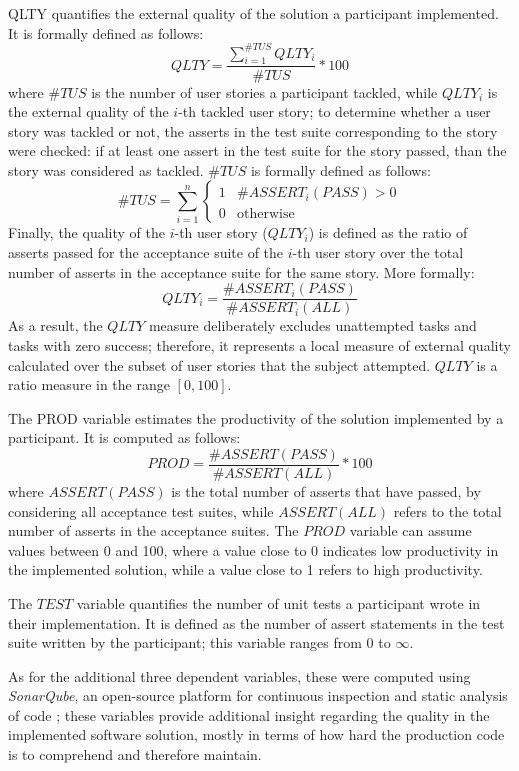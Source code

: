 QLTY quantifies the external quality of the solution a participant implemented. It is formally defined as follows: 
\[
    QLTY = \frac{\sum_{i=1}^{\#TUS} QLTY_i}{\#TUS} * 100 
\]
where $\#TUS$ is the number of user stories a participant tackled, while $QLTY_i$ is the external quality of the $i$-th tackled user story; to determine whether a user story was tackled or not, the asserts in the test suite corresponding to the story were checked: if at least one assert in the test suite for the story passed, than the story was considered as tackled. $\#TUS$ is formally defined as follows:
\[
    \#TUS = \sum_{i=1}^{n} 
        \begin{cases}
            1 & \text{$\#ASSERT_i(PASS) > 0$}\\
                0 & \text{otherwise}
        \end{cases}
\]
Finally, the quality of the $i$-th user story (\ie $QLTY_i$) is defined as the ratio of asserts passed for the acceptance suite of the $i$-th user story over the total number of asserts in the acceptance suite for the same story. More formally:
\[
    QLTY_i = \frac{\#ASSERT_i(PASS)}{\#ASSERT_i(ALL)}
\]
As a result, the $QLTY$ measure deliberately excludes unattempted tasks and tasks with zero success; therefore, it represents a local measure of external quality calculated over the subset of user stories that the subject attempted. $QLTY$ is a ratio measure in the range $[0, 100]$.

The PROD variable estimates the productivity of the solution implemented by a participant. It is computed as follows:
\[
    PROD = \frac{\#ASSERT(PASS)}{\#ASSERT(ALL)} * 100
\]
where $ASSERT(PASS)$ is the total number of asserts that have passed, by considering all acceptance test suites, while $ASSERT(ALL)$ refers to the total number of asserts in the acceptance suites. The $PROD$ variable can assume values between 0 and 100, where a value close to 0 indicates low productivity in the implemented solution, while a value close to 1 refers to high productivity.

The $TEST$ variable quantifies the number of unit tests a participant wrote in their implementation. It is defined as the number of assert statements in the test suite written by the participant; this variable ranges from 0 to $\infty$.

As for the additional three dependent variables, these were computed using \textit{SonarQube}, an open-source platform for continuous inspection and static analysis of code \cite{SonarQube}; these variables provide additional insight regarding the quality in the implemented software solution, mostly in terms of how hard the production code is to comprehend and therefore maintain. 

